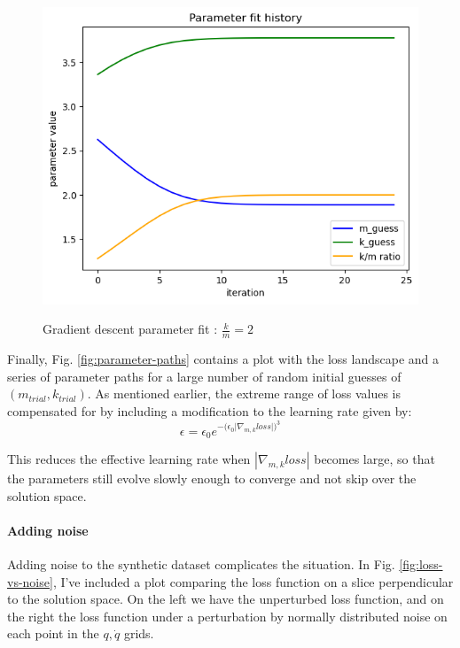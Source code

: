 \documentclass[]{article}
\begin{document}
\begin{figure}[H]
	\caption{Gradient descent parameter fit : $\frac{k}{m}=2$}
	\centering
	\includegraphics[scale=0.70]{parameter-fit.png}
	\label{fig:parameter-fit}
\end{figure}

Finally, Fig. \ref{fig:parameter-paths} contains a plot with the loss landscape and a series of parameter paths for a large number of random initial guesses of $(m_{trial},k_{trial})$. As mentioned earlier, the extreme range of loss values is compensated for by including a modification to the learning rate given by:
\begin{equation}
	\epsilon = \epsilon_0 e^{-\Big(\epsilon_0 \big| \nabla_{m,k} loss\big|\Big)^3}
\end{equation}

This reduces the effective learning rate when $|\nabla_{m,k} loss|$ becomes large, so that the parameters still evolve slowly enough to converge and not skip over the solution space.

\paragraph{Adding noise}
Adding noise to the synthetic dataset complicates the situation. In Fig. \ref{fig:loss-vs-noise}, I've included a plot comparing the loss function on a slice perpendicular to the solution space. On the left we have the unperturbed loss function, and on the right the loss function under a perturbation by normally distributed noise on each point in the $q,\dot{q}$ grids.
\end{document}
